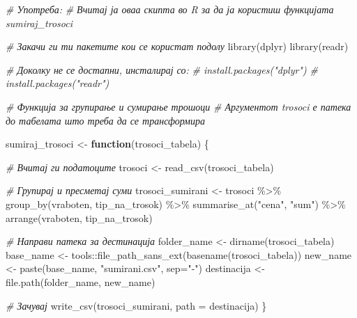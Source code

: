 \documentclass[
]{book}
\newenvironment{Shaded}{\begin{snugshade}}{\end{snugshade}}
\newcommand{\AttributeTok}[1]{\textcolor[rgb]{0.77,0.63,0.00}{#1}}
\newcommand{\CommentTok}[1]{\textcolor[rgb]{0.56,0.35,0.01}{\textit{#1}}}
\newcommand{\ControlFlowTok}[1]{\textcolor[rgb]{0.13,0.29,0.53}{\textbf{#1}}}
\newcommand{\FunctionTok}[1]{\textcolor[rgb]{0.00,0.00,0.00}{#1}}
\newcommand{\NormalTok}[1]{#1}
\newcommand{\OtherTok}[1]{\textcolor[rgb]{0.56,0.35,0.01}{#1}}
\newcommand{\SpecialCharTok}[1]{\textcolor[rgb]{0.00,0.00,0.00}{#1}}
\newcommand{\StringTok}[1]{\textcolor[rgb]{0.31,0.60,0.02}{#1}}
\begin{document}
\begin{Shaded}
\begin{Highlighting}[]
\CommentTok{\# Употреба:}
\CommentTok{\# Вчитај ја оваа скипта во R за да ја користиш функцијата \textasciigrave{}sumiraj\_trosoci\textasciigrave{}  }

\CommentTok{\# Закачи ги ти пакетите кои се користат подолу }
\FunctionTok{library}\NormalTok{(dplyr)}
\FunctionTok{library}\NormalTok{(readr)}

\CommentTok{\# Доколку не се достапни, инсталирај со:}
\CommentTok{\# install.packages("dplyr")}
\CommentTok{\# install.packages("readr")}

\CommentTok{\# Функција за групирање и сумирање трошоци}
\CommentTok{\# Аргументот \textasciigrave{}trosoci\textasciigrave{} е патека до табелата што треба да се трансформира}

\NormalTok{sumiraj\_trosoci }\OtherTok{\textless{}{-}} \ControlFlowTok{function}\NormalTok{(trosoci\_tabela) \{}
  
  \CommentTok{\# Вчитај ги податоците}
\NormalTok{  trosoci }\OtherTok{\textless{}{-}} \FunctionTok{read\_csv}\NormalTok{(trosoci\_tabela)}
  
  \CommentTok{\# Групирај и пресметај суми}
\NormalTok{  trosoci\_sumirani }\OtherTok{\textless{}{-}}\NormalTok{ trosoci }\SpecialCharTok{\%\textgreater{}\%}
    \FunctionTok{group\_by}\NormalTok{(vraboten, tip\_na\_trosok) }\SpecialCharTok{\%\textgreater{}\%}
    \FunctionTok{summarise\_at}\NormalTok{(}\StringTok{"cena"}\NormalTok{, }\StringTok{"sum"}\NormalTok{) }\SpecialCharTok{\%\textgreater{}\%} 
  \FunctionTok{arrange}\NormalTok{(vraboten, tip\_na\_trosok)}
  
  \CommentTok{\# Направи патека за дестинација}
\NormalTok{  folder\_name }\OtherTok{\textless{}{-}} \FunctionTok{dirname}\NormalTok{(trosoci\_tabela)}
\NormalTok{  base\_name }\OtherTok{\textless{}{-}}\NormalTok{ tools}\SpecialCharTok{::}\FunctionTok{file\_path\_sans\_ext}\NormalTok{(}\FunctionTok{basename}\NormalTok{(trosoci\_tabela))}
\NormalTok{  new\_name }\OtherTok{\textless{}{-}} \FunctionTok{paste}\NormalTok{(base\_name, }\StringTok{"sumirani.csv"}\NormalTok{, }\AttributeTok{sep=}\StringTok{"{-}"}\NormalTok{)}
\NormalTok{  destinacija }\OtherTok{\textless{}{-}} \FunctionTok{file.path}\NormalTok{(folder\_name, new\_name)}
  
  \CommentTok{\# Зачувај}
  \FunctionTok{write\_csv}\NormalTok{(trosoci\_sumirani, }\AttributeTok{path =}\NormalTok{ destinacija)}
\NormalTok{\}}
\end{Highlighting}
\end{Shaded}
\end{document}

